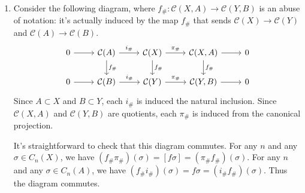 \documentclass[twoside,10pt]{article}
\begin{document}
\begin{enumerate}
	\item Consider the following diagram, where $f_{\#} : \mathcal{C}(X,A) \to \mathcal{C}(Y,B)$ is an abuse of notation: it's actually induced by the map $f_{\#}$ that sends $\mathcal{C}(X)\to \mathcal{C}(Y)$ and $\mathcal{C}(A) \to \mathcal{C}(B)$.
		\[
		\begin{tikzcd}
			0 \rar & \mathcal{C}(A) \rar{i_{\#}}\dar{f_{\#}} & \mathcal{C}(X) \rar{\pi_{\#}}\dar{f_{\#}} & \mathcal{C}(X,A) \rar\dar{f_{\#}} & 0 \\
			0 \rar & \mathcal{C}(B) \rar{i_{\#}} & \mathcal{C}(Y) \rar{\pi_{\#}} & \mathcal{C}(Y,B) \rar & 0
		\end{tikzcd}
		\] 
		Since $A \subset X$ and $B \subset Y$, each $i_{\#}$ is induced the natural inclusion. Since $\mathcal{C}(X,A)$ and $\mathcal{C}(Y,B)$ are quotients, each $\pi_{\#}$ is induced from the canonical projection.

		It's straightforward to check that this diagram commutes. For any $n$ and any $\sigma \in C_{n}(X)$, we have $(f_{\#}\pi_{\#})(\sigma) = [f\sigma] = (\pi_{\#}f_{\#})(\sigma)$. For any $n$ and any $\sigma \in C_{n}(A)$, we have $(f_{\#}i_{\#})(\sigma) = f\sigma = (i_{\#}f_{\#})(\sigma)$. Thus the diagram commutes.


\end{enumerate}
\end{document}
